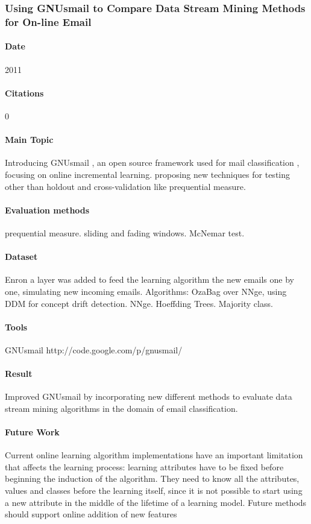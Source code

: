 \documentclass[12pt]{article}
\begin{document}
\subsubsection{Using GNUsmail to Compare Data Stream Mining Methods for On-line Email}
\paragraph{Date} 2011

\paragraph{Citations} 0

\paragraph{Main Topic}
Introducing GNUsmail , an open source framework used for mail classification , focusing on online incremental learning.
proposing new techniques for testing other than holdout and cross-validation like prequential measure.

\paragraph{Evaluation methods}
prequential measure.
sliding and fading windows.
McNemar test.

\paragraph{Dataset}
Enron
a layer was added to feed the learning algorithm the new emails one by one, simulating new incoming emails.
Algorithms:
OzaBag over NNge, using DDM for concept drift detection.
NNge.
Hoeffding Trees.
Majority class.
\paragraph{Tools}
GNUsmail
http://code.google.com/p/gnusmail/

\paragraph{Result}
Improved GNUsmail by incorporating new different methods to evaluate data stream mining algorithms in the domain of email classification.

\paragraph{Future Work}
Current online learning algorithm implementations have an important limitation that affects the learning process: learning attributes have to be fixed before beginning the induction of the algorithm. They need to know all the attributes, values and classes before the learning itself, since it is not possible to start using a new attribute in the middle of the lifetime of a learning model. Future methods should support online addition of new features
\end{document}
